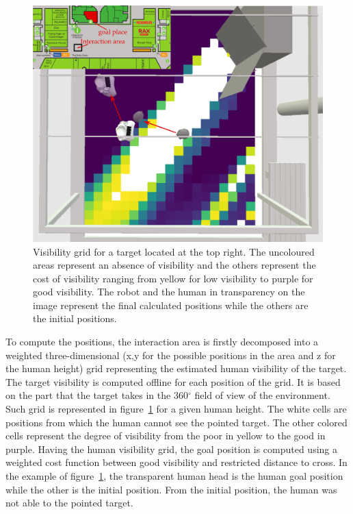 \begin{figure}[ht!]
\centering
\includegraphics[scale=0.3]{figures/chapter8/grid_map.png}
\caption{\label{fig:chap8_svp_grid} Visibility grid for a target located at the top right. The uncoloured areas represent an absence of visibility and the others represent the cost of visibility ranging from yellow for low visibility to purple for good visibility. The robot and the human in transparency on the image represent the final calculated positions while the others are the initial positions. }
\end{figure}

To compute the positions, the interaction area is firstly decomposed into a weighted three-dimensional (x,y for the possible positions in the area and z for the human height) grid representing the estimated human visibility of the target. The target visibility is computed offline for each position of the grid. It is based on the part that the target takes in the 360${^\circ}$ field of view of the environment. Such grid is represented in figure~\ref{fig:chap8_svp_grid} for a given human height. The white cells are positions from which the human cannot see the pointed target. The other colored cells represent the degree of visibility from the poor in yellow to the good in purple. Having the human visibility grid, the goal position is computed using a weighted cost function between good visibility and restricted distance to cross. In the example of figure~\ref{fig:chap8_svp_grid}, the transparent human head is the human goal position while the other is the initial position. From the initial position, the human was not able to the pointed target.


